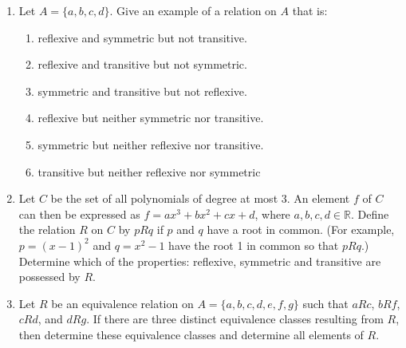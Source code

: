 \documentclass[12pt]{article}
\newcommand{\RR}{{\mathbb R}}  %
\begin{document}
\begin{enumerate}
\item Let $A=\{a,b,c,d\}$.
  Give an example of a relation on $A$ that is:
  \begin{enumerate}
    \item reflexive and symmetric but not transitive.
    \item reflexive and transitive but not symmetric.
    \item symmetric and transitive but not reflexive.
    \item reflexive but neither symmetric nor transitive.
    \item symmetric but neither reflexive nor transitive.
    \item transitive but neither reflexive nor symmetric
  \end{enumerate}

\item Let $C$ be the set of all polynomials of degree at most 3.
    An element $f$ of $C$ can then be expressed as
    $f=ax^3 + bx^2 + cx+d$, where $a, b, c, d \in\RR$.
    Define the relation $R$ on $C$ by $p R q$ if $p$ and $q$ have a root in common.
    (For example, $p = (x-1)^2$ and $q = x^2 - 1$ have the root 1 in common so that $p R q$.)
    Determine which of the properties:  reflexive, symmetric and transitive are possessed by $R$.

   
\item Let $R$ be an equivalence relation on $A = \{a, b, c, d, e, f , g\}$ such that $a R c$, $b R f$,  $c R d$, and $d R g$.
    If there are three distinct equivalence classes resulting from $R$, then determine these equivalence classes and
    determine all elements of $R$.

\end{enumerate}
\end{document}

